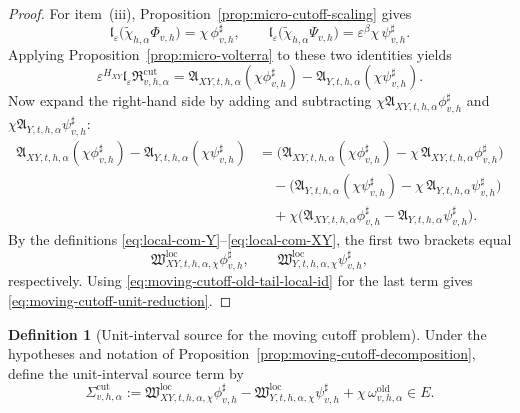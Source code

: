 \documentclass[11pt,a4paper]{amsart}
\theoremstyle{plain}
\theoremstyle{definition}
\newtheorem{definition}[theorem]{Definition}
\theoremstyle{remark}
\begin{document}
\begin{proof}
For item~(iii), Proposition~\ref{prop:micro-cutoff-scaling} gives
\[
\mathfrak l_{\varepsilon}
\bigl(
\widetilde\chi_{h,\alpha}\Phi_{v,h}
\bigr)
=
\chi\,\phi_{v,h}^{\sharp},
\qquad
\mathfrak l_{\varepsilon}
\bigl(
\widetilde\chi_{h,\alpha}\Psi_{v,h}
\bigr)
=
\varepsilon^{\beta}\chi\,\psi_{v,h}^{\sharp}.
\]
Applying Proposition~\ref{prop:micro-volterra} to these two identities yields
\[
\varepsilon^{H_{XY}}
\mathfrak l_{\varepsilon}
\mathfrak R_{v,h,\alpha}^{\mathrm{cut}}
=
\mathfrak A_{XY,t,h,\alpha}(\chi\phi_{v,h}^{\sharp})
-
\mathfrak A_{Y,t,h,\alpha}(\chi\psi_{v,h}^{\sharp}).
\]
Now expand the right-hand side by adding and subtracting
\(\chi \mathfrak A_{XY,t,h,\alpha}\phi_{v,h}^{\sharp}\) and
\(\chi \mathfrak A_{Y,t,h,\alpha}\psi_{v,h}^{\sharp}\):
\begin{align*}
\mathfrak A_{XY,t,h,\alpha}(\chi\phi_{v,h}^{\sharp})
-
\mathfrak A_{Y,t,h,\alpha}(\chi\psi_{v,h}^{\sharp})
&=
\bigl(
\mathfrak A_{XY,t,h,\alpha}(\chi\phi_{v,h}^{\sharp})
-
\chi\,\mathfrak A_{XY,t,h,\alpha}\phi_{v,h}^{\sharp}
\bigr) \\
&\quad-
\bigl(
\mathfrak A_{Y,t,h,\alpha}(\chi\psi_{v,h}^{\sharp})
-
\chi\,\mathfrak A_{Y,t,h,\alpha}\psi_{v,h}^{\sharp}
\bigr) \\
&\quad+
\chi\bigl(
\mathfrak A_{XY,t,h,\alpha}\phi_{v,h}^{\sharp}
-
\mathfrak A_{Y,t,h,\alpha}\psi_{v,h}^{\sharp}
\bigr).
\end{align*}
By the definitions \eqref{eq:local-com-Y}--\eqref{eq:local-com-XY}, the first two brackets equal
\[
\mathfrak W_{XY,t,h,\alpha,\chi}^{\mathrm{loc}}\phi_{v,h}^{\sharp},
\qquad
\mathfrak W_{Y,t,h,\alpha,\chi}^{\mathrm{loc}}\psi_{v,h}^{\sharp},
\]
respectively. Using \eqref{eq:moving-cutoff-old-tail-local-id} for the last term gives
\eqref{eq:moving-cutoff-unit-reduction}.
\end{proof}

\begin{definition}[Unit-interval source for the moving cutoff problem]
\label{def:moving-cutoff-local-source}
Under the hypotheses and notation of Proposition~\ref{prop:moving-cutoff-decomposition}, define
the unit-interval source term by
\begin{equation}\label{eq:moving-cutoff-local-source}
\Sigma_{v,h,\alpha}^{\mathrm{cut}}
:=
\mathfrak W_{XY,t,h,\alpha,\chi}^{\mathrm{loc}}
\phi_{v,h}^{\sharp}
-
\mathfrak W_{Y,t,h,\alpha,\chi}^{\mathrm{loc}}
\psi_{v,h}^{\sharp}
+
\chi\,\omega_{v,h,\alpha}^{\mathrm{old}}
\in E.
\end{equation}
\end{definition}
\end{document}

